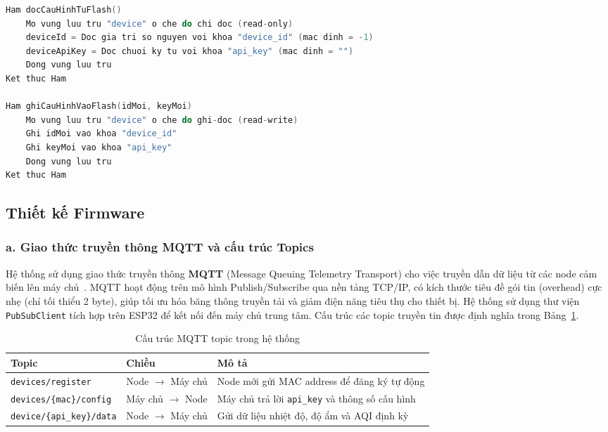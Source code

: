 \begin{lstlisting}[language=C, caption={Giai thuat luu va doc cau hinh dinh danh tren Flash}, label={lst:preferences_pseudo}]
Ham docCauHinhTuFlash()
    Mo vung luu tru "device" o che do chi doc (read-only)
    deviceId = Doc gia tri so nguyen voi khoa "device_id" (mac dinh = -1)
    deviceApiKey = Doc chuoi ky tu voi khoa "api_key" (mac dinh = "")
    Dong vung luu tru
Ket thuc Ham

Ham ghiCauHinhVaoFlash(idMoi, keyMoi)
    Mo vung luu tru "device" o che do ghi-doc (read-write)
    Ghi idMoi vao khoa "device_id"
    Ghi keyMoi vao khoa "api_key"
    Dong vung luu tru
Ket thuc Ham
\end{lstlisting}

\subsection{Thiết kế Firmware}
\label{subsec:design:firmware}

\subsubsection*{a. Giao thức truyền thông MQTT và cấu trúc Topics}

Hệ thống sử dụng giao thức truyền thông \textbf{MQTT} (Message Queuing Telemetry Transport) cho việc truyền dẫn dữ liệu từ các node cảm biến lên máy chủ~\cite{banks2014mqtt}. MQTT hoạt động trên mô hình Publish/Subscribe qua nền tảng TCP/IP, có kích thước tiêu đề gói tin (overhead) cực nhẹ (chỉ tối thiểu 2 byte), giúp tối ưu hóa băng thông truyền tải và giảm điện năng tiêu thụ cho thiết bị. Hệ thống sử dụng thư viện \texttt{PubSubClient} tích hợp trên ESP32 để kết nối đến máy chủ trung tâm. Cấu trúc các topic truyền tin được định nghĩa trong Bảng~\ref{tab:mqtt_topics}.

\begin{table}[H]
  \centering
  \caption{Cấu trúc MQTT topic trong hệ thống}
  \label{tab:mqtt_topics}
  \begin{tabularx}{\textwidth}{p{6cm} p{2cm} X}
    \toprule
    \textbf{Topic} & \textbf{Chiều} & \textbf{Mô tả} \\
    \midrule
    \texttt{devices/register}
      & Node $\to$ Máy chủ
      & Node mới gửi MAC address để đăng ký tự động \\
    \texttt{devices/\{mac\}/config}
      & Máy chủ $\to$ Node
      & Máy chủ trả lời \texttt{api\_key} và thông số cấu hình \\
    \texttt{device/\{api\_key\}/data}
      & Node $\to$ Máy chủ
      & Gửi dữ liệu nhiệt độ, độ ẩm và AQI định kỳ \\
    \bottomrule
  \end{tabularx}
\end{table}

